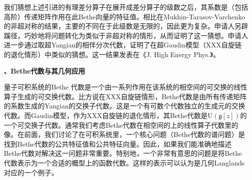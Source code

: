 \documentclass[12pt,UTF8,AutoFakeBold=4,a4paper]{ctexart}
\begin{document}
我们猜想上述引进的有理差分算子在展开成差分算子的级数之后，其系数是（包括高阶）传递矩阵作用在此Bethe向量的特征值。相比在Mukhin-Tarasov-Varchenko的非超对称的结果，主要的不同在于此级数是无限的，因此更为复杂。申请人另辟蹊径，巧妙地将问题转化为类似于非超对称的情形，从而证明了这一猜想。申请人进一步通过取超Yangian的相伴分次代数，证明了在超Gaudin模型（XXX自旋链的退化情形）中类似的猜想。这一结果发表在《J. High Energy Phys.》。



\medskip

\textbf{、Bethe代数与其几何应用}

量子可积系统的Bethe 代数是一个由一系列作用在该系统的相空间的可交换的线性算子生成的可交换代数。比方说在XXX自旋链情形，Bethe代数是由所有传递矩阵的系数生成的Yangian的交换子代数。这是一个有可数个代数独立的生成元的交换代数。而Gaudin模型，作为XXX自旋链的退化情形，其Bethe代数是$\mathrm{U}(\mathfrak{g}[z])$的一个可交换子代数。通常我们考虑Bethe代数在相空间的上的线性算子代数里的像。在前面，我们讨论了在可积系统里，一个核心问题（Bethe代数的谱问题）是找到Bethe代数的公共特征值和公共特征向量。因此，如果我们能准确地描述Bethe代数对解决这一问题非常重要。特别地，一个非常有意思的问题是将Bethe代数表示为一个合适的概型上的函数代数。这样的表示可以认为是几何Langlands对应的一个例子。
\end{document}
